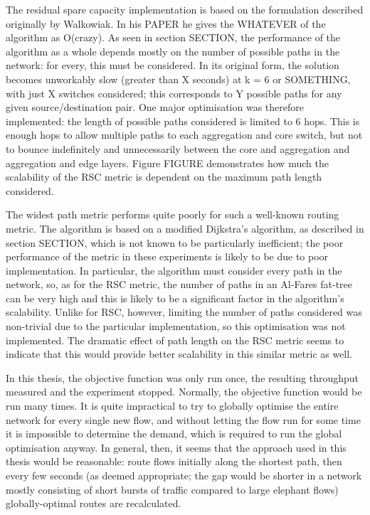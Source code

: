 The residual spare capacity implementation is based on the formulation described originally by Walkowiak. In his PAPER he gives the WHATEVER of the algorithm as O(crazy). As seen in section SECTION, the performance of the algorithm as a whole depends mostly on the number of possible paths in the network: for every, this must be considered. In its original form, the solution becomes unworkably slow (greater than X seconds) at k = 6 or SOMETHING, with just X switches considered; this corresponds to Y possible paths for any given source/destination pair. One major optimisation was therefore implemented: the length of possible paths considered is limited to 6 hops. This is enough hops to allow multiple paths to each aggregation and core switch, but not to bounce indefinitely and unnecessarily between the core and aggregation and aggregation and edge layers. Figure FIGURE demonstrates how much the scalability of the RSC metric is dependent on the maximum path length considered.

The widest path metric performs quite poorly for such a well-known routing metric. The algorithm is based on a modified Dijkstra's algorithm, as described in section SECTION, which is not known to be particularly inefficient; the poor performance of the metric in these experiments is likely to be due to poor implementation. In particular, the algorithm must consider every path in the network, so, as for the RSC metric, the number of paths in an Al-Fares fat-tree can be very high and this is likely to be a significant factor in the algorithm's scalability. Unlike for RSC, however, limiting the number of paths considered was non-trivial due to the particular implementation, so this optimisation was not implemented. The dramatic effect of path length on the RSC metric seems to indicate that this would provide better scalability in this similar metric as well.

In this thesis, the objective function was only run once, the resulting throughput measured and the experiment stopped. Normally, the objective function would be run many times. It is quite impractical to try to globally optimise the entire network for every single new flow, and without letting the flow run for some time it is impossible to determine the demand, which is required to run the global optimisation anyway. In general, then, it seems that the approach used in this thesis would be reasonable: route flows initially along the shortest path, then every few seconds (as deemed appropriate; the gap would be shorter in a network mostly consisting of short bursts of traffic compared to large elephant flows) globally-optimal routes are recalculated.

